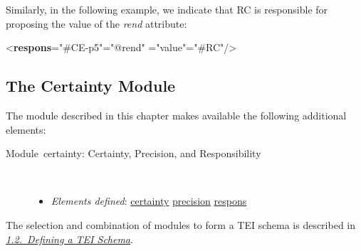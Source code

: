 Similarly, in the following example, we indicate that RC is responsible for proposing the value of the {\itshape rend} attribute: \par\bgroup{}\exampleFont \begin{shaded}\noindent\mbox{}{<\textbf{respons}\hspace*{1em}{target}="{\#CE-p5}"\hspace*{1em}{match}="{@rend}"\mbox{}\newline 
\hspace*{1em}{locus}="{value}"\hspace*{1em}{resp}="{\#RC}"/>}\end{shaded}\egroup\par 
\subsection[{The Certainty Module}]{The Certainty Module}\par
The module described in this chapter makes available the following additional elements: \begin{description}

\item[{Module certainty: Certainty, Precision, and Responsibility}]\hspace{1em}\hfill\linebreak
\mbox{}\\[-10pt] \begin{itemize}
\item {\itshape Elements defined}: \hyperref[TEI.certainty]{certainty} \hyperref[TEI.precision]{precision} \hyperref[TEI.respons]{respons}
\end{itemize} 
\end{description}   The selection and combination of modules to form a TEI schema is described in \textit{\hyperref[STIN]{1.2.\ Defining a TEI Schema}}.